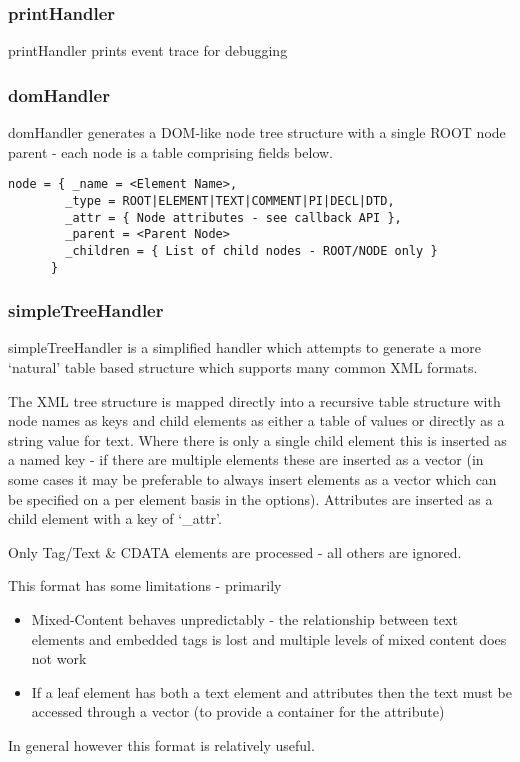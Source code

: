 \documentclass{ltxdoc}
\begin{document}
\subsubsection{printHandler}

printHandler prints event trace for debugging

\subsubsection{domHandler}

domHandler generates a DOM-like node tree  structure with 
a single ROOT node parent - each node is a table comprising 
fields below.

\begin{verbatim}
node = { _name = <Element Name>,
        _type = ROOT|ELEMENT|TEXT|COMMENT|PI|DECL|DTD,
        _attr = { Node attributes - see callback API },
        _parent = <Parent Node>
        _children = { List of child nodes - ROOT/NODE only }
      }

\end{verbatim}
\subsubsection{simpleTreeHandler}

simpleTreeHandler is a simplified handler which attempts to generate a
more `natural' table based structure which supports many common XML
formats.

The XML tree structure is mapped directly into a recursive table
structure with node names as keys and child elements as either a table
of values or directly as a string value for text. Where there is only a
single child element this is inserted as a named key - if there are
multiple elements these are inserted as a vector (in some cases it may
be preferable to always insert elements as a vector which can be
specified on a per element basis in the options). Attributes are
inserted as a child element with a key of `\_attr'.

Only Tag/Text \& CDATA elements are processed - all others are ignored.

This format has some limitations - primarily

\begin{itemize}
\item  Mixed-Content behaves unpredictably - the relationship between text
  elements and embedded tags is lost and multiple levels of mixed
  content does not work
\item  If a leaf element has both a text element and attributes then the text
  must be accessed through a vector (to provide a container for the
  attribute)
\end{itemize}
In general however this format is relatively useful.
\end{document}
